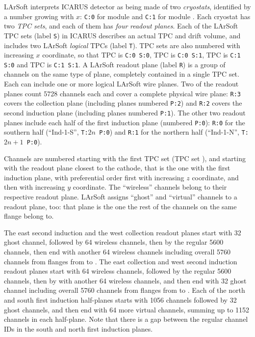 LArSoft interprets ICARUS detector as being made of two \emph{cryostats},
identified by a number growing with $x$:
\texttt{C:0} for module  and \texttt{C:1} for module .
Each cryostat has two \emph{TPC sets}, and each of them has \emph{four}
\emph{readout planes}.
Each of the LArSoft TPC sets (label \texttt{S}) in ICARUS describes an actual TPC and drift
volume, and includes two LArSoft \emph{logical} TPCs (label \texttt{T}).
TPC sets are also numbered with increasing $x$ coordinate, so that
TPC  is \texttt{C:0 S:0}, TPC  is \texttt{C:0 S:1},
TPC  is \texttt{C:1 S:0} and TPC  is \texttt{C:1 S:1}.
A LArSoft readout plane (label \texttt{R}) is a group of channels on the same type of plane,
completely contained in a single TPC set.
Each can include one or more logical LArSoft wire planes.
Two of the readout planes count 5728 channels each and cover a complete physical wire
plane: \texttt{R:3} covers the collection plane (including planes numbered \texttt{P:2})
and \texttt{R:2} covers the second induction plane (including planes numbered \texttt{P:1}).
The other two readout planes include each half of the first induction plane (numbered \texttt{P:0}):
\texttt{R:0} for the southern half (``Ind-1-S'', \texttt{T:$2n$ P:0})
and \texttt{R:1} for the northern half (``Ind-1-N'', \texttt{T:$2n+1$ P:0}).

Channels are numbered starting with the first TPC set (TPC set ),
and starting with the readout plane closest to the cathode,
that is the one with the first induction plane, with preferential order first
with increasing $z$ coordinate, and then with increasing $y$ coordinate.
The ``wireless'' channels belong to their respective readout plane.
LArSoft assigns ``ghost'' and ``virtual'' channels to a readout plane, too:
that plane is the one the rest of the channels on the same flange belong to.

The east second induction and the west collection readout planes start with 32 ghost channel,
followed by 64 wireless channels, then by the regular 5600 channels,
then end with another 64 wireless channels
including overall 5760 channels from flanges from  to .
The east collection  and west second induction readout planes start with 64 wireless channels,
followed by the regular 5600 channels,
then by with another 64 wireless channels, and then end with 32 ghost channel
including overall 5760 channels from flanges from  to .
Each of the north and south first induction half-planes starts with 1056 channels
followed by 32 ghost channels, and then end with 64 more virtual channels,
summing up to 1152 channels in each half-plane.
Note that there is a gap between the regular channel IDs in the south
and north first induction planes.

